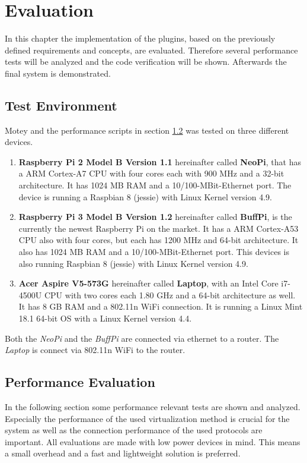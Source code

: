 \chapter{Evaluation}
\label{chapter:evaluation}
\minitoc\vspace{.5cm}
In this chapter the implementation of the plugins, based on the previously defined requirements and concepts, are evaluated.
Therefore several performance tests will be analyzed and the code verification will be shown.
Afterwards the final system is demonstrated.

\section{Test Environment}
\label{section:test-environment}
Motey and the performance scripts in section \ref{section:performance-evaluation} was tested on three different devices.
\begin{enumerate}
  \item \textbf{Raspberry Pi 2 Model B Version 1.1} hereinafter called \textbf{NeoPi}, that has a ARM Cortex-A7 \ac{CPU} with four cores each with 900 MHz and a 32-bit architecture. It has 1024 MB \ac{RAM} and a 10/100-MBit-Ethernet port. The device is running a Raspbian 8 (jessie) with Linux Kernel version 4.9.
  \item \textbf{Raspberry Pi 3 Model B Version 1.2} hereinafter called \textbf{BuffPi}, is the currently the newest Raspberry Pi on the market. It has a ARM Cortex-A53 \ac{CPU} also with four cores, but each has 1200 MHz and 64-bit architecture. It also has 1024 MB \ac{RAM} and a 10/100-MBit-Ethernet port.  This devices is also running Raspbian 8 (jessie) with Linux Kernel version 4.9.
  \item \textbf{Acer Aspire V5-573G} hereinafter called \textbf{Laptop}, with an Intel Core i7-4500U \ac{CPU} with two cores each 1.80 GHz and a 64-bit architecture as well. It has 8 GB \ac{RAM} and a 802.11n WiFi connection. It is running a Linux Mint 18.1  64-bit \ac{OS} with a Linux Kernel version 4.4.
\end{enumerate}

Both the \textit{NeoPi} and the \textit{BuffPi} are connected via ethernet to a router.
The \textit{Laptop} is connect via 802.11n WiFi to the router.

\section{Performance Evaluation}
\label{section:performance-evaluation}
In the following section some performance relevant tests are shown and analyzed.
Especially the performance of the used virtualization method is crucial for the system as well as the connection performance of the used protocols are important.
All evaluations are made with low power devices in mind.
This means a small overhead and a fast and lightweight solution is preferred.

